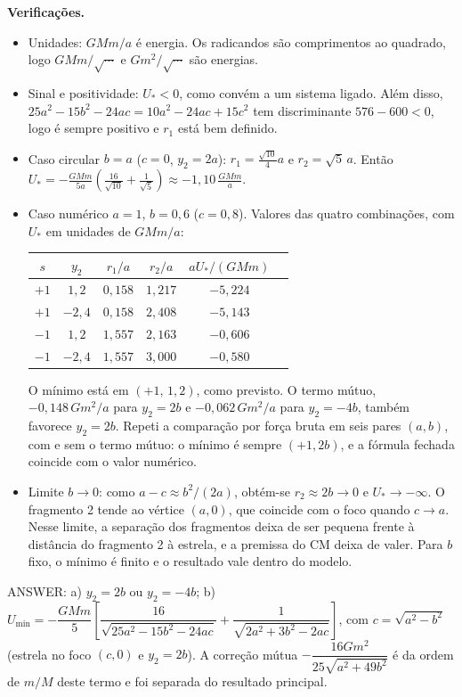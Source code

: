 \documentclass{article}%
\begin{document}
\textbf{Verificações.}
\begin{itemize}
\item Unidades: $GMm/a$ é energia. Os radicandos são comprimentos ao quadrado, logo $GMm/\sqrt{\cdots}$ e $Gm^2/\sqrt{\cdots}$ são energias.
\item Sinal e positividade: $U_*<0$, como convém a um sistema ligado. Além disso, $25a^2-15b^2-24ac=10a^2-24ac+15c^2$ tem discriminante $576-600<0$, logo é sempre positivo e $r_1$ está bem definido.
\item Caso circular $b=a$ ($c=0$, $y_2=2a$): $r_1=\frac{\sqrt{10}}{4}a$ e $r_2=\sqrt5\,a$. Então $U_*=-\frac{GMm}{5a}\left(\frac{16}{\sqrt{10}}+\frac{1}{\sqrt5}\right)\approx-1{,}10\,\frac{GMm}{a}$.
\item Caso numérico $a=1$, $b=0{,}6$ ($c=0{,}8$). Valores das quatro combinações, com $U_*$ em unidades de $GMm/a$:
\begin{center}
\begin{tabular}{cccccc}
$s$ & $y_2$ & $r_1/a$ & $r_2/a$ & $aU_*/(GMm)$ \\
\hline
$+1$ & $1{,}2$ & $0{,}158$ & $1{,}217$ & $-5{,}224$ \\
$+1$ & $-2{,}4$ & $0{,}158$ & $2{,}408$ & $-5{,}143$ \\
$-1$ & $1{,}2$ & $1{,}557$ & $2{,}163$ & $-0{,}606$ \\
$-1$ & $-2{,}4$ & $1{,}557$ & $3{,}000$ & $-0{,}580$
\end{tabular}
\end{center}
O mínimo está em $(+1,\,1{,}2)$, como previsto. O termo mútuo, $-0{,}148\,Gm^2/a$ para $y_2=2b$ e $-0{,}062\,Gm^2/a$ para $y_2=-4b$, também favorece $y_2=2b$. Repeti a comparação por força bruta em seis pares $(a,b)$, com e sem o termo mútuo: o mínimo é sempre $(+1,2b)$, e a fórmula fechada coincide com o valor numérico.
\item Limite $b\to 0$: como $a-c\approx b^2/(2a)$, obtém-se $r_2\approx 2b\to 0$ e $U_*\to-\infty$. O fragmento 2 tende ao vértice $(a,0)$, que coincide com o foco quando $c\to a$. Nesse limite, a separação dos fragmentos deixa de ser pequena frente à distância do fragmento 2 à estrela, e a premissa do CM deixa de valer. Para $b$ fixo, o mínimo é finito e o resultado vale dentro do modelo.
\end{itemize}

ANSWER: a) $y_2=2b$ ou $y_2=-4b$; b) $U_{\min}=-\dfrac{GMm}{5}\left[\dfrac{16}{\sqrt{25a^2-15b^2-24ac}}+\dfrac{1}{\sqrt{2a^2+3b^2-2ac}}\right]$, com $c=\sqrt{a^2-b^2}$ (estrela no foco $(c,0)$ e $y_2=2b$). A correção mútua $-\dfrac{16Gm^2}{25\sqrt{a^2+49b^2}}$ é da ordem de $m/M$ deste termo e foi separada do resultado principal.%
\newpage%
\end{document}
